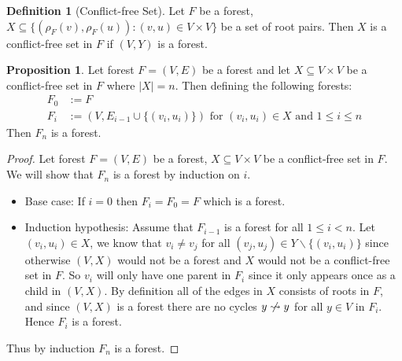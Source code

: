 \documentclass[a4paper,12pt]{article}
\theoremstyle{definition}
\newtheorem{definition}{Definition}[section]
\newtheorem{proposition}{Proposition}[section]
\begin{document}
\begin{definition}[Conflict-free Set]
    Let $F$ be a forest, $X \subseteq \{(\rho_F(v), \rho_F(u)) : (v, u) \in V
    \times V\}$ be a set of root pairs. Then $X$ is a conflict-free set in $F$
    if $(V, Y)$ is a forest.
\end{definition}

\begin{proposition}
    Let forest $F = (V, E)$ be a forest and let $X \subseteq V \times V$ be a
    conflict-free set in $F$ where $|X| = n$. Then defining the following forests:
    \begin{align*}
        F_0 &:= F \\
        F_{i} &:= (V, E_{i - 1} \cup \{(v_i, u_i)\}) \text{ for } (v_i, u_i) \in X \text{ and } 1 \leq i \leq n
    \end{align*}
    Then $F_n$ is a forest.
\end{proposition}

\begin{proof}
    Let forest $F = (V, E)$ be a forest, $X \subseteq V \times V$ be a
    conflict-free set in $F$. We will show that $F_n$ is a forest by induction
    on $i$.
    \begin{itemize}
        \item Base case: If $i = 0$ then $F_i = F_0 = F$ which is a forest.
        \item Induction hypothesis: Assume that $F_{i - 1}$ is a forest for all
        $1 \leq i < n$.  Let $(v_i, u_i) \in X$, we know that $v_i \neq v_j$ for
        all $(v_j, u_j) \in Y \backslash \{(v_i, u_i)\}$ since otherwise $(V,
        X)$ would not be a forest and $X$ would not be a conflict-free set in
        $F$. So $v_i$ will only have one parent in $F_i$ since it only appears
        once as a child in $(V, X)$. By definition all of the edges in $X$
        consists of roots in $F$, and since $(V, X)$ is a forest there are no
        cycles $y \centernot\leadsto y$ for all $y \in V$ in $F_i$. Hence $F_i$
        is a forest.
    \end{itemize}
    Thus by induction $F_n$ is a forest.
\end{proof}
\end{document}
